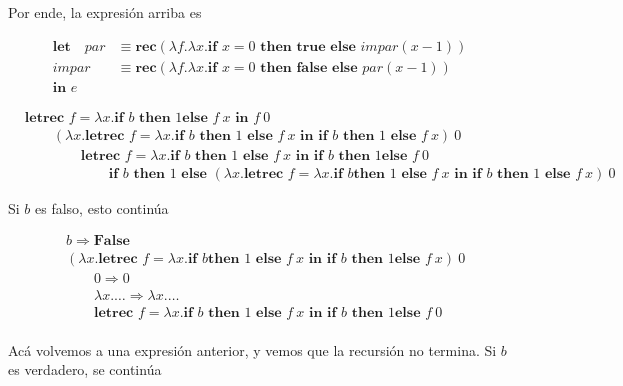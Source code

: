 \documentclass[article, 12pt]{article}
\begin{document}
Por ende, la expresión arriba es

\begin{align*}
  \textbf{let ~ } 
  par &\equiv \textbf{rec}(\lambda f.\lambda x. 
    \textbf{if } x = 0 \textbf{ then true}
    \textbf{ else }impar(x-1)
  )\\
  impar &\equiv \textbf{rec}(\lambda f.\lambda x. 
    \textbf{if } x = 0 \textbf{ then false}
    \textbf{ else }par(x-1)
  ) \\ 
  \textbf{in } e
\end{align*}


\pagebreak 

\begin{align*}
&\textbf{letrec } f = \lambda x. \textbf{if } b \textbf{ then } 1 \textbf{
    else } f ~ x \textbf{ in } f~0 \\ 
&\qquad (\lambda x. \textbf{letrec } f = \lambda x. \textbf{if } b \textbf{ then } 1 \textbf{ else } f ~ x
\textbf{ in } \textbf{if } b \textbf{ then } 1 \textbf{ else } f ~ x) ~ 0 \\ 
&\qquad \qquad \textbf{letrec } f = \lambda x. \textbf{if } b \textbf{ then } 1
\textbf{ else } f ~ x \textbf{ in }  \textbf{if } b \textbf{ then } 1 \textbf{
else } f ~ 0 \\ 
&\qquad \qquad \qquad 
\textbf{if } b \textbf{ then } 1 \textbf{ else } 
(\lambda x. \textbf{letrec } f = \lambda x.\textbf{if } b \textbf{then } 1 \textbf{ else } f ~ x \textbf{ in } \textbf{if } b \textbf{ then } 1 \textbf{ else } f ~ x) ~ 0
\end{align*}

Si $b$ es falso, esto continúa 

\begin{align*}
&b \Rightarrow \textbf{False} \\ 
& 
(\lambda x. \textbf{letrec } f = \lambda x.\textbf{if } b \textbf{then } 1
\textbf{ else } f ~ x \textbf{ in } \textbf{if } b \textbf{ then } 1 \textbf{
else } f ~ x) ~ 0 \\ 
&\qquad 0 \Rightarrow 0 \\ 
&\qquad \lambda x. \ldots \Rightarrow \lambda x. \ldots \\
&\qquad\textbf{letrec } f = \lambda x.\textbf{if } b \textbf{ then } 1
\textbf{ else } f ~ x \textbf{ in } \textbf{if } b \textbf{ then } 1 \textbf{
else } f ~ 0 \\ 
\end{align*}

Acá volvemos a una expresión anterior, y vemos que la recursión no termina. Si
$b$ es verdadero, se continúa
\end{document}
